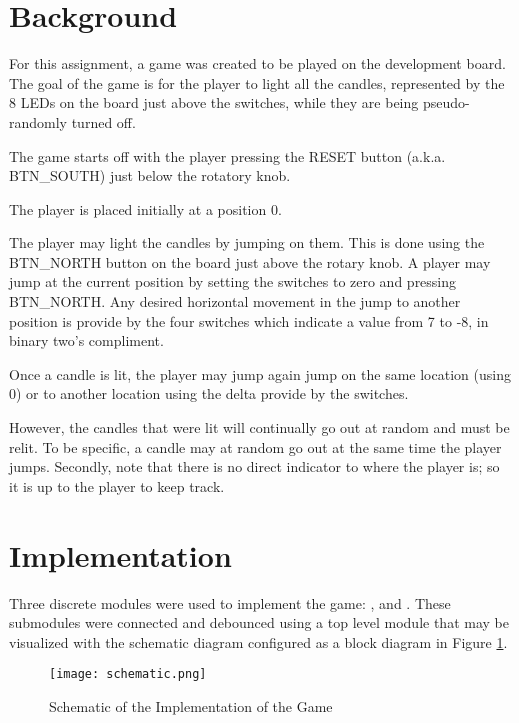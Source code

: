 \documentclass[paper=usletter, fontsize=12pt]{article}
\begin{document}
    \vspace{-0.1in}

    \section{Background}
    For this assignment, a game was created to be played on the development board. The goal of the game is for the player to light all the candles, represented by the 8 LEDs on the board just above the switches, while they are being pseudo-randomly turned off.
    
    The game starts off with the player pressing the RESET button (a.k.a. BTN\_SOUTH) just below the rotatory knob.

    The player is placed initially at a position 0.

    The player may light the candles by jumping on them. This is done using the BTN\_NORTH button on the board just above the rotary knob. A player may jump at the current position by setting the switches to zero and pressing BTN\_NORTH. Any desired horizontal movement in the jump to another position is provide by the four switches which indicate a value from 7 to -8, in binary two's compliment.

    Once a candle is lit, the player may jump again jump on the same location (using 0) or to another location using the delta provide by the switches.

    However, the candles that were lit will continually go out at random and must be relit. To be specific, a candle may at random go out at the same time the player jumps. Secondly, note that there is no direct indicator to where the player is; so it is up to the player to keep track.

    \section{Implementation}
    Three discrete modules were used to implement the game: ,  and . These submodules were connected and debounced using a top level module that may be visualized with the schematic diagram configured as a block diagram in Figure \ref{fig:schematic}.

    \begin{figure}[ht]
        \begin{center}
            \texttt{[image: schematic.png]}
            \caption{Schematic of the Implementation of the Game} \label{fig:schematic}
        \end{center}
    \end{figure}
    \newpage
\end{document}
